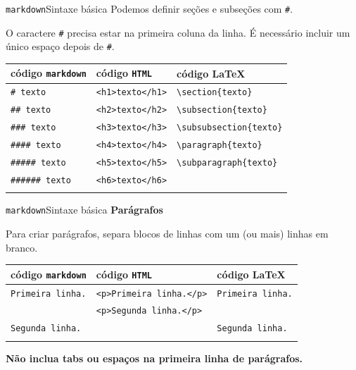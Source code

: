 \documentclass[
  10pt,
  ignorenonframetext,
]{beamer}
\begin{document}
\begin{frame}[fragile]{\texttt{markdown}\newline Sintaxe básica}
\protect\hypertarget{markdownsintaxe-buxe1sica-1}{}
Podemos definir seções e subseções com \texttt{\#}.

\colorbox{cabecalho}{\textcolor{titulo}{O caractere \texttt{\#} precisa estar na primeira coluna da linha.}}\newline
\colorbox{cabecalho}{\textcolor{titulo}{É necessário incluir um único espaço depois de \texttt{\#}.}}

\begin{longtable}[]{@{}lll@{}}
\toprule\noalign{}
código \texttt{markdown} & código \texttt{HTML} & código \LaTeX \\
\midrule\noalign{}
\endhead
\texttt{\#\ texto} &
\texttt{\textless{}h1\textgreater{}texto\textless{}/h1\textgreater{}} &
\texttt{\textbackslash{}section\{texto\}} \\
\texttt{\#\#\ texto} &
\texttt{\textless{}h2\textgreater{}texto\textless{}/h2\textgreater{}} &
\texttt{\textbackslash{}subsection\{texto\}} \\
\texttt{\#\#\#\ texto} &
\texttt{\textless{}h3\textgreater{}texto\textless{}/h3\textgreater{}} &
\texttt{\textbackslash{}subsubsection\{texto\}} \\
\texttt{\#\#\#\#\ texto} &
\texttt{\textless{}h4\textgreater{}texto\textless{}/h4\textgreater{}} &
\texttt{\textbackslash{}paragraph\{texto\}} \\
\texttt{\#\#\#\#\#\ texto} &
\texttt{\textless{}h5\textgreater{}texto\textless{}/h5\textgreater{}} &
\texttt{\textbackslash{}subparagraph\{texto\}} \\
\texttt{\#\#\#\#\#\#\ texto} &
\texttt{\textless{}h6\textgreater{}texto\textless{}/h6\textgreater{}}
& \\
\bottomrule\noalign{}
\end{longtable}
\end{frame}

\begin{frame}[fragile]{\texttt{markdown}\newline Sintaxe básica}
\protect\hypertarget{markdownsintaxe-buxe1sica-2}{}
\textbf{Parágrafos}

Para criar parágrafos, separa blocos de linhas com um (ou mais) linhas
em branco.

\begin{longtable}[]{@{}lll@{}}
\toprule\noalign{}
código \texttt{markdown} & código \texttt{HTML} & código \LaTeX \\
\midrule\noalign{}
\endhead
\texttt{Primeira\ linha.} &
\texttt{\textless{}p\textgreater{}Primeira\ linha.\textless{}/p\textgreater{}}
& \texttt{Primeira\ linha.} \\
&
\texttt{\textless{}p\textgreater{}Segunda\ linha.\textless{}/p\textgreater{}}
& \\
\texttt{Segunda\ linha.} & & \texttt{Segunda\ linha.} \\
\bottomrule\noalign{}
\end{longtable}

\textbf{Não inclua tabs ou espaços na primeira linha de parágrafos.}
\end{frame}
\end{document}
